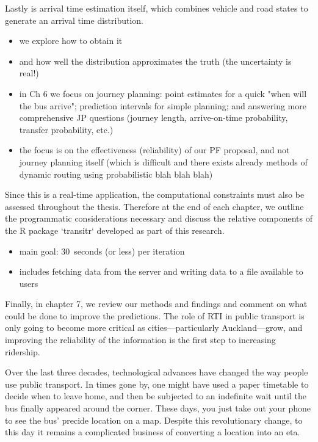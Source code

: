 Lastly is arrival time estimation itself, which combines vehicle and road states to generate an arrival time distribution.
\begin{itemize}
\item we explore how to obtain it
\item and how well the distribution approximates the truth (the uncertainty is real!)
\item in Ch 6 we focus on journey planning: point estimates for a quick "when will the bus arrive"; prediction intervals for simple planning; and answering more comprehensive JP questions (journey length, arrive-on-time probability, transfer probability, etc.)
\item the focus is on the effectiveness (reliability) of our PF proposal, and not journey planning itself (which is difficult and there exists already methods of dynamic routing using probabilistic blah blah blah)
\end{itemize}

Since this is a real-time application, the computational constraints must also be assessed throughout the thesis. Therefore at the end of each chapter, we outline the programmatic considerations necessary and discuss the relative components of the R package `transitr` developed as part of this research.
\begin{itemize}
\item main goal: 30~seconds (or less) per iteration
\item includes fetching data from the server and writing data to a file available to users
\end{itemize}

Finally, in chapter 7, we review our methods and findings and comment on what could be done to improve the predictions. The role of RTI in public transport is only going to become more critical as cities---particularly Auckland---grow, and improving the reliability of the information is the first step to increasing ridership.






\pagebreak

Over the last three decades, technological advances have changed the way people use public transport. In times gone by, one might have used a paper timetable to decide when to leave home, and then be subjected to an indefinite wait until the bus finally appeared around the corner. These days, you just take out your phone to see the bus' precide location on a map. Despite this revolutionary change, to this day it remains a complicated business of converting a location into an \gls{eta}.


